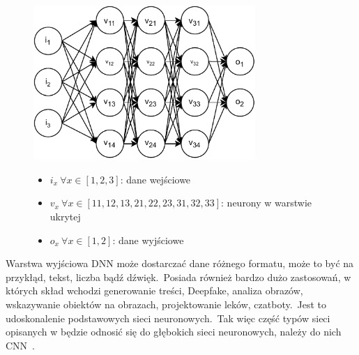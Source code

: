 \begin{figure}[H]
    \centering
    \includegraphics[width=0.75\textwidth]{images/deep-neural-network}
    \begin{itemize}
        \item[] $i_x \  \forall x \in [1, 2, 3]$: dane wejściowe
        \item[] $v_x \ \forall x \in [11, 12, 13, 21, 22, 23, 31, 32, 33]$: neurony w warstwie ukrytej
        \item[] $o_x \ \forall x \in [1, 2]$: dane wyjściowe
    \end{itemize}
    \label{fig:deep-learn}
\end{figure}

Warstwa wyjściowa DNN może dostarczać dane różnego formatu, może to być na przykłąd, tekst, liczba bądź dźwięk.\ Posiada również bardzo dużo zastosowań, w których skład wchodzi generowanie treści, Deepfake, analiza obrazów, wskazywanie obiektów na obrazach, projektowanie leków, czatboty.\ Jest to udoskonalenie podstawowych sieci neuronowych.\ Tak więc część typów sieci opisanych w  będzie odnosić się do głębokich sieci neuronowych, należy do nich CNN~\cite{MicrosoftDeep2023}.